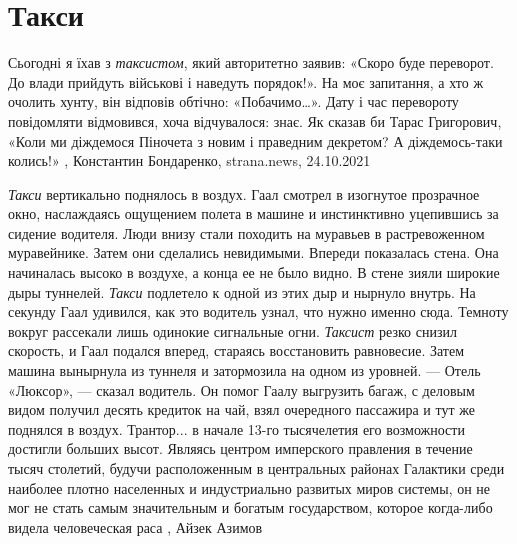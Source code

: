  
 
 
 
 

\chapter{Такси}

Сьогодні я їхав з \emph{таксистом}, який авторитетно заявив: «Скоро буде
переворот. До влади прийдуть військові і наведуть порядок!». На моє запитання,
а хто ж очолить хунту, він відповів обтічно: «Побачимо…». Дату і час перевороту
повідомляти відмовився, хоча відчувалося: знає.  Як сказав би Тарас Григорович,
«Коли ми діждемося Піночета з новим і праведним декретом? А діждемось-таки
колись!»
, 
Константин Бондаренко, strana.news, 24.10.2021

\emph{Такси} вертикально поднялось в воздух. Гаал смотрел в изогнутое
прозрачное окно, наслаждаясь ощущением полета в машине и инстинктивно
уцепившись за сидение водителя. Люди внизу стали походить на муравьев в
растревоженном муравейнике.  Затем они сделались невидимыми.  Впереди
показалась стена. Она начиналась высоко в воздухе, а конца ее не было видно. В
стене зияли широкие дыры туннелей. \emph{Такси} подлетело к одной из этих дыр и
нырнуло внутрь. На секунду Гаал удивился, как это водитель узнал, что нужно
именно сюда. Темноту вокруг рассекали лишь одинокие сигнальные огни.
\emph{Таксист} резко снизил скорость, и Гаал подался вперед, стараясь
восстановить равновесие. Затем машина вынырнула из туннеля и затормозила на
одном из уровней.  — Отель «Люксор», — сказал водитель.  Он помог Гаалу
выгрузить багаж, с деловым видом получил десять кредиток на чай, взял
очередного пассажира и тут же поднялся в воздух.  Трантор... в начале 13-го
тысячелетия его возможности достигли больших высот. Являясь центром имперского
правления в течение тысяч столетий, будучи расположенным в центральных районах
Галактики среди наиболее плотно населенных и индустриально развитых миров
системы, он не мог не стать самым значительным и богатым государством, которое
когда-либо видела человеческая раса
, Айзек Азимов
